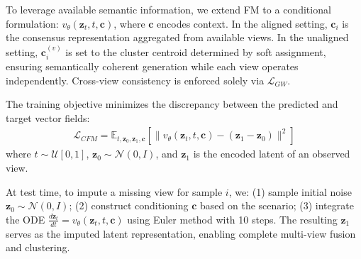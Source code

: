 \documentclass{article}
\DeclareMathOperator*{\argmax}{arg\,max}
\theoremstyle{plain}
\theoremstyle{definition}
\theoremstyle{remark}
\begin{document}
To leverage available semantic information, we extend FM to a conditional formulation: $v_\theta(\mathbf{z}_t, t, \mathbf{c})$, where $\mathbf{c}$ encodes context. In the aligned setting, $\mathbf{c}_i$ is the consensus representation aggregated from available views. In the unaligned setting,  $\mathbf{c}_i^{(v)}$ is set to the cluster centroid determined by soft assignment, ensuring semantically coherent generation while each view operates independently. Cross-view consistency is enforced solely via $\mathcal{L}_{GW}$.

The training objective minimizes the discrepancy between the predicted and target vector fields:
\begin{align}
\mathcal{L}_{CFM} = \mathbb{E}_{t, \mathbf{z}_0, \mathbf{z}_1, \mathbf{c}} \left[ \| v_\theta(\mathbf{z}_t, t, \mathbf{c}) - (\mathbf{z}_1 - \mathbf{z}_0) \|^2 \right]
\end{align}
where $t \sim \mathcal{U}[0,1]$, $\mathbf{z}_0 \sim \mathcal{N}(0, I)$, and $\mathbf{z}_1$ is the encoded latent of an observed view.

At test time, to impute a missing view for sample $i$, we: (1) sample initial noise $\mathbf{z}_0 \sim \mathcal{N}(0, I)$; (2) construct conditioning $\mathbf{c}$ based on the scenario; (3) integrate the ODE $\frac{d\mathbf{z}_t}{dt} = v_\theta(\mathbf{z}_t, t, \mathbf{c})$ using Euler method with 10 steps. The resulting $\mathbf{z}_1$ serves as the imputed latent representation, enabling complete multi-view fusion and clustering.
\end{document}
